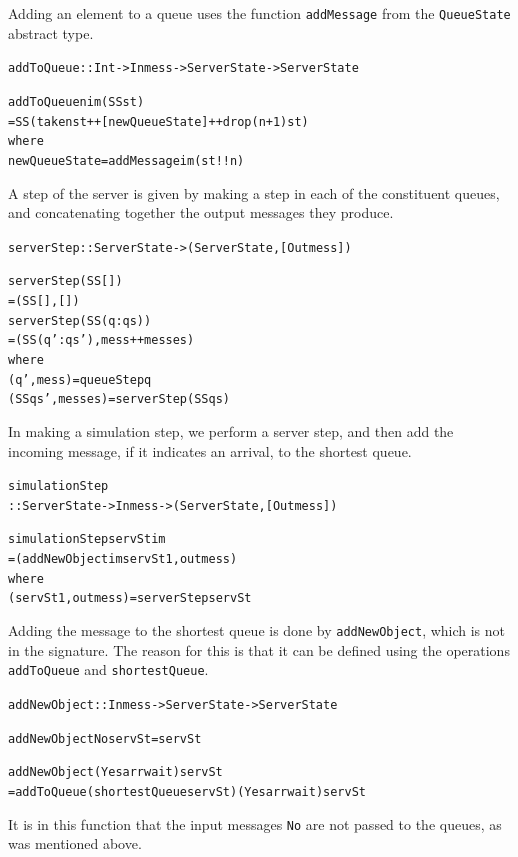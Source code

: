 Adding an element to a queue uses the function \texttt{addMessage} from the 
\texttt{QueueState} abstract type.
\begin{alltt} 
addToQueue :: Int -> Inmess -> ServerState -> ServerState
 
addToQueue n im (SS st)
  = SS (take n st ++ [newQueueState] ++ drop (n+1) st)
    where
    newQueueState = addMessage im (st!!n)
\end{alltt}
A step of the server is given by making a step in each of the constituent
queues, and concatenating together the output messages they produce.
\begin{alltt} 
serverStep :: ServerState -> ( ServerState , [Outmess] )

serverStep (SS [])
  = (SS [],[])
serverStep (SS (q:qs)) 
  =  (SS (q':qs') , mess++messes)
    where
    (q' , mess)       = queueStep  q
    (SS qs' , messes) = serverStep (SS qs)
\end{alltt}
In making a simulation step, we perform a server step, and then add the
incoming message, if it indicates an arrival, to the shortest queue. 
\begin{alltt}
simulationStep       
  :: ServerState -> Inmess -> ( ServerState , [Outmess] )

simulationStep servSt im 
  = (addNewObject im servSt1 , outmess)
    where
    (servSt1 , outmess) = serverStep servSt
\end{alltt}
Adding the message to the shortest queue is done by \texttt{addNewObject}, which
is not in the signature. The reason for this is that it can be defined using
the operations \texttt{addToQueue} and \texttt{shortestQueue}.
\begin{alltt}
addNewObject :: Inmess -> ServerState -> ServerState

addNewObject No servSt = servSt

addNewObject (Yes arr wait) servSt
  = addToQueue (shortestQueue servSt) (Yes arr wait) servSt
\end{alltt}
It is in this function that the input messages \texttt{No} are not passed to the
queues, as was mentioned above.


